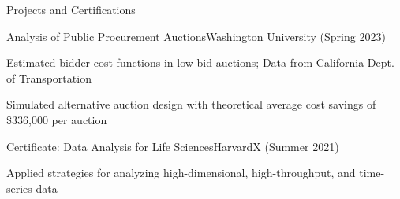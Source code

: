   \begin{rSection}{Projects and Certifications}
    \begin{rSubsection}{Analysis of Public Procurement Auctions}{Washington University (Spring 2023)}{}{}
    \item Estimated bidder cost functions in low-bid auctions; Data from California Dept. of Transportation
    \item Simulated alternative auction design with theoretical average cost savings of \$336,000 per auction
    \end{rSubsection}
    \begin{rSubsection}{Certificate: Data Analysis for Life Sciences}{HarvardX (Summer 2021)}{}{} 
    \item Applied strategies for analyzing high-dimensional, high-throughput, and time-series data
    \end{rSubsection}
  \end{rSection}
